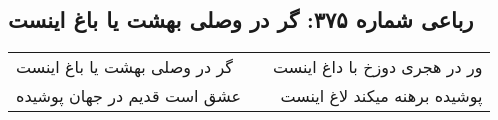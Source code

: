 \begin{center}
\section*{رباعی شماره ۳۷۵: گر در وصلی بهشت یا باغ اینست}
\label{sec:0375}
\begin{longtable}{l p{0.5cm} r}
گر در وصلی بهشت یا باغ اینست
&&
ور در هجری دوزخ با داغ اینست
\\
عشق است قدیم در جهان پوشیده
&&
پوشیده برهنه میکند لاغ اینست
\\
\end{longtable}
\end{center}

